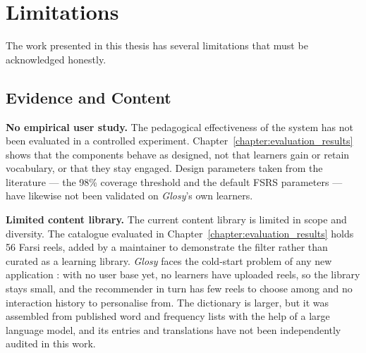 \section{Limitations}
\label{sec:limitations}
    The work presented in this thesis has several limitations that must be acknowledged honestly.

    \subsection{Evidence and Content}
    \begin{sloppypar}
    \textbf{No empirical user study.} The pedagogical effectiveness of the system has not been evaluated in a controlled experiment. Chapter~\ref{chapter:evaluation_results} shows that the components behave as designed, not that learners gain or retain vocabulary, or that they stay engaged. Design parameters taken from the literature --- the 98\% coverage threshold and the default FSRS parameters --- have likewise not been validated on \textit{Glosy}'s own learners.

    \textbf{Limited content library.} The current content library is limited in scope and diversity. The catalogue evaluated in Chapter~\ref{chapter:evaluation_results} holds 56 Farsi reels, added by a maintainer to demonstrate the filter rather than curated as a learning library. \textit{Glosy} faces the cold-start problem of any new application \cite{adomavicius2005toward}: with no user base yet, no learners have uploaded reels, so the library stays small, and the recommender in turn has few reels to choose among and no interaction history to personalise from. The dictionary is larger, but it was assembled from published word and frequency lists with the help of a large language model, and its entries and translations have not been independently audited in this work.
    \end{sloppypar}

